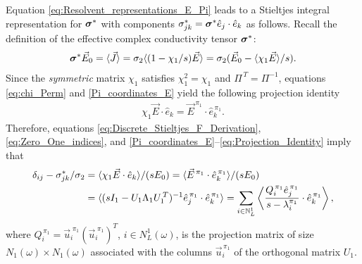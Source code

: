 \documentclass{cmslatex}
\newcommand\bsig{\mbox{\boldmath${\sigma}$}}
\begin{document}
Equation \eqref{eq:Resolvent_representations_E_Pi} leads to a
Stieltjes integral representation for $\bsig^*$ with components
$\sigma^*_{jk}=\bsig^*\hat{e}_j\cdot\hat{e}_k$ as follows. Recall the
definition of the effective complex conductivity tensor $\bsig^*$:
%
\begin{align}\label{eq:Eff_Cond_Tens_Def}
  \bsig^*\vec{E}_0=\langle\vec{J}\rangle 
                =\sigma_2\langle(1-\chi_1/s)\vec{E}\rangle
                =\sigma_2(\vec{E}_0 -\langle\chi_1\vec{E}\rangle/s).
\end{align}
%
Since the \emph{symmetric} matrix $\chi_1$ satisfies $\chi_1^2=\chi_1$ and
$\Pi^{\,T}=\Pi^{-1}$, equations \eqref{eq:chi_Perm} and
\eqref{Pi_coordinates_E} yield the following projection identity  
%
\begin{align}\label{eq:Projection_Identity}
 \chi_1\vec{E}\cdot\hat{e}_k=\vec{E}^{\,\pi_1}\cdot\hat{e}_k^{\,\pi_1}.
\end{align}
%
Therefore, equations \eqref{eq:Discrete_Stieltjes_F_Derivation},
\eqref{eq:Zero_One_indices}, and
\eqref{Pi_coordinates_E}--\eqref{eq:Projection_Identity} 
imply that  
%
\begin{align}\label{eq:Disc_Stieltjes_Rep_Sigma}
  \delta_{ij}-\sigma^*_{jk}/\sigma_2&=\langle\chi_1\vec{E}\cdot\hat{e}_k\rangle/(sE_0)
          =\langle\vec{E}^{\,\pi_1}\cdot\hat{e}_k^{\,\pi_1}\rangle/(sE_0)
          \notag\\
          &=\langle(sI_1-U_1\Lambda_1U_1^{\,T})^{-1}\hat{e}_j^{\,\pi_1}\cdot\hat{e}_k^{\,\pi_1}\rangle          
          =\sum_{i\in\mathbb{N}_L^1}\left\langle
          \frac{Q_i^{\,\pi_1}\hat{e}_j^{\,\pi_1}}{s-\lambda_i^{\pi_1}}\cdot\hat{e}_k^{\,\pi_1}
          \right\rangle,  
\end{align}
%
where $Q_i^{\,\pi_1}=\vec{u}_i^{\;\pi_1}(\vec{u}_i^{\;\pi_1})^T$,
$i\in N_L^1(\omega)$, is the projection matrix of size $N_1(\omega)\times N_1(\omega)$
associated with the columns $\vec{u}_i^{\,\pi_1}$ of the orthogonal
matrix $U_1$.  
\end{document}
